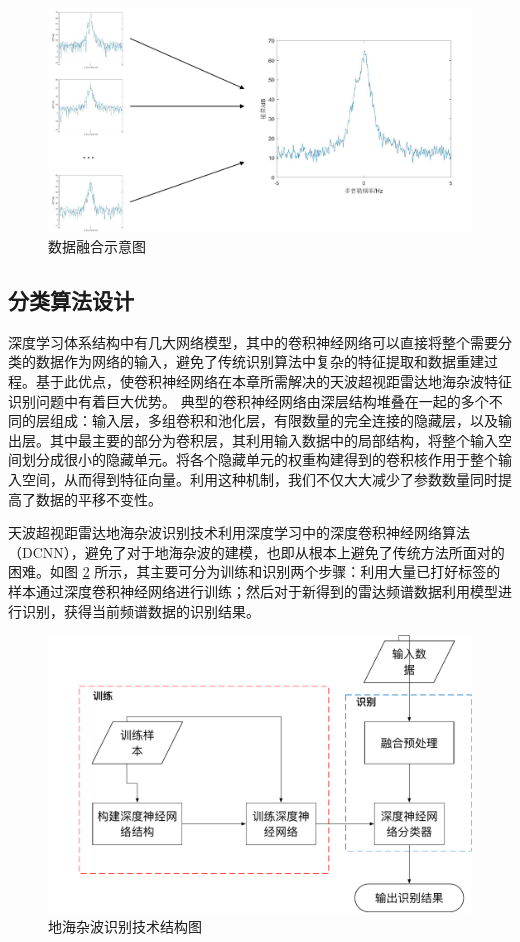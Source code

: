 \begin{figure}[H]
	\centering
	\includegraphics[width=\textwidth]{figures/spectrum_fusion}
	\caption{数据融合示意图}
	\label{fig:spectrum_fusion}
\end{figure}

\subsection{分类算法设计}
深度学习体系结构中有几大网络模型，其中的卷积神经网络可以直接将整个需要分类的数据作为网络的输入，避免了传统识别算法中复杂的特征提取和数据重建过程。基于此优点，使卷积神经网络在本章所需解决的天波超视距雷达地海杂波特征识别问题中有着巨大优势。
典型的卷积神经网络由深层结构堆叠在一起的多个不同的层组成：输入层，多组卷积和池化层，有限数量的完全连接的隐藏层，以及输出层。其中最主要的部分为卷积层，其利用输入数据中的局部结构，将整个输入空间划分成很小的隐藏单元。将各个隐藏单元的权重构建得到的卷积核作用于整个输入空间，从而得到特征向量。利用这种机制，我们不仅大大减少了参数数量同时提高了数据的平移不变性。

天波超视距雷达地海杂波识别技术利用深度学习中的深度卷积神经网络算法（DCNN），避免了对于地海杂波的建模，也即从根本上避免了传统方法所面对的困难。如图 \ref{fig:othr_tech} 所示，其主要可分为训练和识别两个步骤：利用大量已打好标签的样本通过深度卷积神经网络进行训练；然后对于新得到的雷达频谱数据利用模型进行识别，获得当前频谱数据的识别结果。

\begin{figure}[H]
	\centering
	\includegraphics[width=\textwidth]{figures/othr_tech}
	\caption{地海杂波识别技术结构图}
	\label{fig:othr_tech}
\end{figure}

